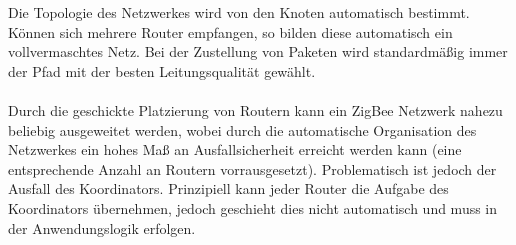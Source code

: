                 Die Topologie des Netzwerkes wird von den Knoten automatisch bestimmt. Können
                sich mehrere Router empfangen, so bilden diese automatisch ein vollvermaschtes
                Netz. Bei der Zustellung von Paketen wird standardmäßig immer der Pfad mit
                der besten Leitungsqualität gewählt.\\
                \\
                Durch die geschickte Platzierung von Routern kann ein ZigBee Netzwerk
                nahezu beliebig ausgeweitet werden, wobei durch die automatische Organisation
                des Netzwerkes ein hohes Maß an Ausfallsicherheit erreicht werden kann (eine entsprechende
                Anzahl an Routern vorrausgesetzt). Problematisch ist jedoch der Ausfall des
                Koordinators. Prinzipiell kann jeder Router die Aufgabe des Koordinators übernehmen,
                jedoch geschieht dies nicht automatisch und muss in der Anwendungslogik erfolgen.

